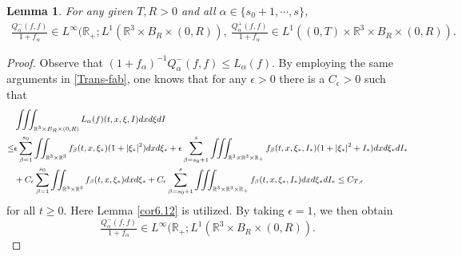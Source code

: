 \documentclass[reqno,11pt]{amsart}
\newtheorem{lemma}{Lemma}[section]
\numberwithin{equation}{section}
\def\R{\mathbb{R}}
\begin{document}
\begin{lemma}\label{Q in L1}
	For any given $T,R>0$ and all $\alpha \in \{s_0+1,\cdots,s\}$, 
	\begin{equation*}
	\begin{aligned}
	\tfrac{Q^-_\alpha (f,f)}{1+f_\alpha} \in L^\infty(\R_+;L^1( \R^3 \times B_R\times (0,R)),\ \tfrac{Q^+_\alpha (f,f)}{1+f_\alpha} \in L^1((0,T)\times \R^3 \times B_R\times (0,R)).
	\end{aligned}
	\end{equation*}
\end{lemma}

\begin{proof}
	Observe that $(1+f_\alpha)^{-1}Q^-_\alpha (f,f)\leq L_\alpha(f)$. By employing the same arguments in \eqref{Trans-fab}, one knows that for any $\epsilon > 0$ there is a $C_\epsilon > 0$ such that
\begin{equation*}{\small
	\begin{aligned}	
		& \iiint_{\R^3 \times B_R \times (0,R)} L_{ \alpha} (f) (t,x,\xi, I) dxd\xi dI \\
			\leq & \epsilon \sum_{\beta = 1}^{s_0} \iint_{\R^3 \times \R^3} f_{\beta} (t, x, \xi_*) (1+|\xi_*|^2) dxd\xi_* + \epsilon \sum_{\beta = s_0 + 1}^{s} \iiint_{\R^3 \times \R^3 \times \R_+} f_{\beta} (t, x, \xi_*, I_*) (1+|\xi_*|^2 +I_*) dxd\xi_* dI_* \\
& + C_\epsilon \sum_{\beta = 1}^{s_0} \iint_{\R^3 \times \R^3} f_{\beta} (t,x, \xi_*) d x d \xi_*  + C_\epsilon \sum_{\beta = s_0 + 1}^{s} \iiint_{\R^3 \times \R^3 \times \R_+} f_{\beta} (t,x, \xi_*, I_*) dxd\xi_* dI_* \leq C_{T, \epsilon}
		\end{aligned}}
	\end{equation*} 
for all $t \geq 0$. Here Lemma \ref{cor6.12} is utilized. By taking $\epsilon = 1$, we then obtain
	\begin{equation*}
		\tfrac{Q^-_\alpha (f,f)}{1+f_\alpha}\in L^\infty(\R_+ ; L^1( \R^3 \times B_R \times (0,R)).
	\end{equation*}



\end{proof}
\end{document}
